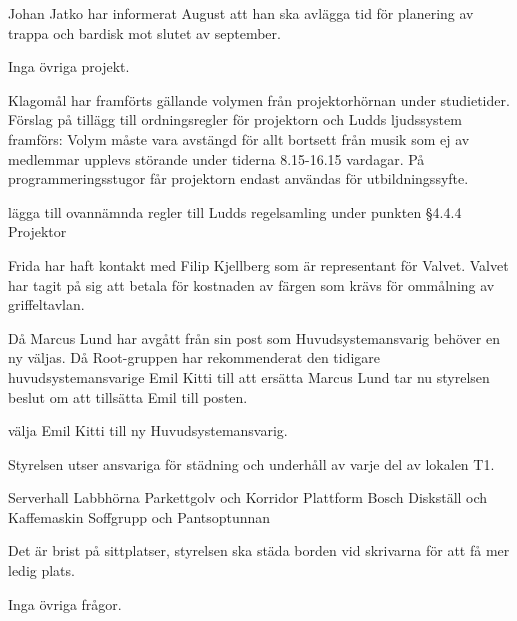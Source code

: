 \documentclass{protokoll}
\begin{document}
Johan Jatko har informerat August att han ska avlägga tid för planering av trappa och bardisk mot slutet av september.

Inga övriga projekt.

Klagomål har framförts gällande volymen från projektorhörnan under studietider. Förslag på tillägg till ordningsregler för projektorn och Ludds ljudssystem framförs: 
Volym måste vara avstängd för allt bortsett från musik som ej av medlemmar upplevs störande under tiderna 8.15-16.15 vardagar. 
På programmeringsstugor får projektorn endast användas för utbildningssyfte.

\begin{beslut}
    \att lägga till ovannämnda regler till Ludds regelsamling under punkten §4.4.4 Projektor
\end{beslut}

Frida har haft kontakt med Filip Kjellberg som är representant för Valvet. Valvet har tagit på sig att betala för kostnaden av färgen som krävs för ommålning av griffeltavlan. 

Då Marcus Lund har avgått från sin post som Huvudsystemansvarig behöver en ny väljas. Då Root-gruppen har rekommenderat den tidigare huvudsystemansvarige Emil Kitti till att ersätta Marcus Lund tar nu styrelsen beslut om att tillsätta Emil till posten. 
\begin{beslut}
    \att välja Emil Kitti till ny Huvudsystemansvarig.
\end{beslut}

Styrelsen utser ansvariga för städning och underhåll av varje del av lokalen T1. 
\begin{list}
    \entry[Kitti] Serverhall 
    \entry[Jens] Labbhörna
    \entry[Frida] Parkettgolv och Korridor
    \entry[Fredrik] Plattform
    \entry[August] Bosch
    \entry[Anton] Diskställ och Kaffemaskin
    \entry[Edvin] Soffgrupp och Pantsoptunnan
\end{list}

Det är brist på sittplatser, styrelsen ska städa borden vid skrivarna för att få mer ledig plats.

Inga övriga frågor.
\end{document}
